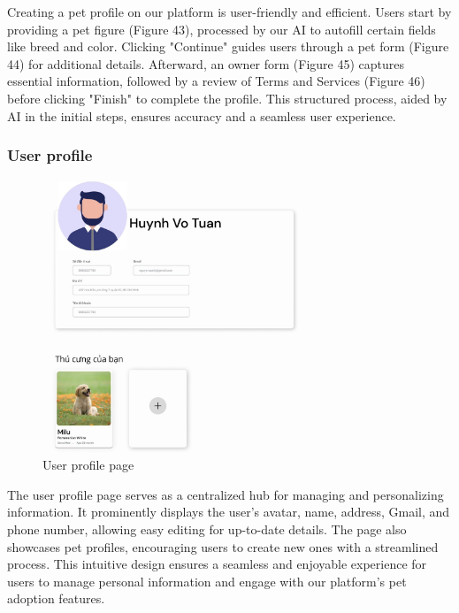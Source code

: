 Creating a pet profile on our platform is user-friendly and efficient. Users start by providing a pet figure (Figure 43), processed by our AI to autofill certain fields like breed and color. Clicking "Continue" guides users through a pet form (Figure 44) for additional details. Afterward, an owner form (Figure 45) captures essential information, followed by a review of Terms and Services (Figure 46) before clicking "Finish" to complete the profile. This structured process, aided by AI in the initial steps, ensures accuracy and a seamless user experience.

\subsubsection{User profile}

\begin{figure}[H]
    \centering
    \includegraphics[width=0.7\textwidth]{Figures/user_profile_ui.jpg}
    \caption{User profile page}
\end{figure}


The user profile page serves as a centralized hub for managing and personalizing information. It prominently displays the user's avatar, name, address, Gmail, and phone number, allowing easy editing for up-to-date details. The page also showcases pet profiles, encouraging users to create new ones with a streamlined process. This intuitive design ensures a seamless and enjoyable experience for users to manage personal information and engage with our platform's pet adoption features.

